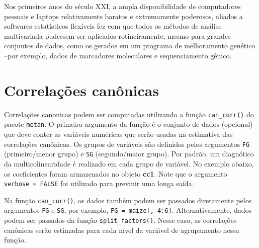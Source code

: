 \documentclass[
]{book}
\newenvironment{Shaded}{\begin{snugshade}}{\end{snugshade}}
\newcommand{\CommentTok}[1]{\textcolor[rgb]{0.56,0.35,0.01}{\textit{#1}}}
\newcommand{\DataTypeTok}[1]{\textcolor[rgb]{0.13,0.29,0.53}{#1}}
\newcommand{\DecValTok}[1]{\textcolor[rgb]{0.00,0.00,0.81}{#1}}
\newcommand{\KeywordTok}[1]{\textcolor[rgb]{0.13,0.29,0.53}{\textbf{#1}}}
\newcommand{\NormalTok}[1]{#1}
\newcommand{\OperatorTok}[1]{\textcolor[rgb]{0.81,0.36,0.00}{\textbf{#1}}}
\newcommand{\OtherTok}[1]{\textcolor[rgb]{0.56,0.35,0.01}{#1}}
\newcommand{\StringTok}[1]{\textcolor[rgb]{0.31,0.60,0.02}{#1}}
\begin{document}
Nos primeiros anos do século XXI, a ampla disponibilidade de computadores pessoais e laptops relativamente baratos e extremamente poderosos, aliados a softwares estatísticos flexíveis fez com que todos os métodos de análise multivariada pudessem ser aplicados rotineiramente, mesmo para grandes conjuntos de dados, como os gerados em um programa de melhoramento genético --por exemplo, dados de marcadores moleculares e sequenciamento gênico.

\hypertarget{correlauxe7uxf5es-canuxf4nicas}{%
\section{Correlações canônicas}\label{correlauxe7uxf5es-canuxf4nicas}}

Correlações canonicas podem ser computadas utilizando a função \texttt{can\_corr()} do pacote \texttt{metan}. O primeiro argumento da função é o conjunto de dados (opcional) que deve conter as variáveis numéricas que serão usadas na estimativa das correlações canônicas. Os grupos de variáveis são definidos pelos argumentos \texttt{FG} (primeiro/menor grupo) e \texttt{SG} (segundo/maior grupo). Por padrão, um diagnótico da multicolinearidade é realizado em cada grupo de variável. No exemplo abaixo, os coeficientes foram armazenados no objeto \textbf{cc1}. Note que o argumento \texttt{verbose\ =\ FALSE} foi utilizado para previnir uma longa saída.

\begin{Shaded}
\end{Shaded}

\begin{dica}
Na função \texttt{can\_corr()}, os dados também podem ser passados diretamente pelos argumentos \texttt{FG} e \texttt{SG}, por exemplo, \texttt{FG\ =\ maize{[},\ 4:6{]}}. Alternativamente, dados podem ser passados da função \texttt{split\_factors()}. Nesse caso, as correlações canônicas serão estimadas para cada nível da variável de agrupamento nessa função.
\end{dica}
\end{document}
